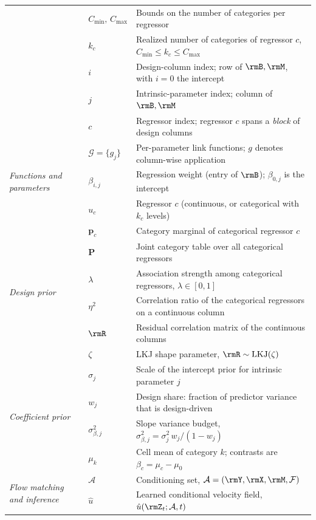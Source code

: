 \begin{table}[h]
\begin{tabularx}{\linewidth}{@{}p{2.4cm} l >{\raggedright\arraybackslash}X@{}}
 & $C_{\mathrm{min}},\,C_{\mathrm{max}}$ & Bounds on the number of categories per regressor \\
 & $k_c$ & Realized number of categories of regressor $c$, $C_{\mathrm{min}}\le k_c\le C_{\mathrm{max}}$ \\
 & $i$ & Design-column index; row of $\rmB,\rmM$, with $i=0$ the intercept \\
 & $j$ & Intrinsic-parameter index; column of $\rmB,\rmM$ \\
 & $c$ & Regressor index; regressor $c$ spans a \emph{block} of design columns \\
\midrule
\multirow{3}{=}{\textit{Functions and parameters}}
 & $\mathcal{G}=\{g_j\}$ & Per-parameter link functions; $g$ denotes column-wise application \\
 & $\beta_{i,j}$ & Regression weight (entry of $\rmB$); $\beta_{0,j}$ is the intercept \\
 & $u_c$ & Regressor $c$ (continuous, or categorical with $k_c$ levels) \\
\midrule
\multirow{6}{=}{\textit{Design prior}}
 & $\bm{p}_c$ & Category marginal of categorical regressor $c$ \\
 & $\bm{P}$ & Joint category table over all categorical regressors \\
 & $\lambda$ & Association strength among categorical regressors, $\lambda\in[0,1]$ \\
 & $\eta^2$ & Correlation ratio of the categorical regressors on a continuous column \\
 & $\rmR$ & Residual correlation matrix of the continuous columns \\
 & $\zeta$ & LKJ shape parameter, $\rmR\sim\mathrm{LKJ}(\zeta)$ \\
\midrule
\multirow{4}{=}{\textit{Coefficient prior}}
 & $\sigma_j$ & Scale of the intercept prior for intrinsic parameter $j$ \\
 & $w_j$ & Design share: fraction of predictor variance that is design-driven \\
 & $\sigma^2_{\beta,j}$ & Slope variance budget, $\sigma^2_{\beta,j}=\sigma_j^2\,w_j/(1-w_j)$ \\
 & $\mu_k$ & Cell mean of category $k$; contrasts are $\beta_c=\mu_c-\mu_0$ \\
\midrule
\multirow{9}{=}{\textit{Flow matching and inference}}
 & $\mathcal{A}$ & Conditioning set, $\mathcal{A}=(\rmY,\rmX,\rmM,\mathcal{F})$ \\
 & $\hat{u}$ & Learned conditional velocity field, $\hat{u}(\rmZ_t;\mathcal{A},t)$ \\

\end{tabularx}
\end{table}
